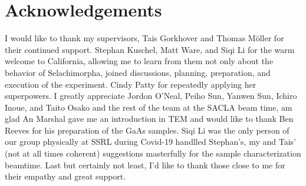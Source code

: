 \begingroup
\let\clearpage\relax
\chapter*{Acknowledgements}
\endgroup


I would like to thank my supervisors, Tais Gorkhover and Thomas Möller for their continued support. 
Stephan Kuschel, Matt Ware, and Siqi Li for the warm welcome to California, allowing me to learn from them not only about the behavior of Selachimorpha, joined discussions, planning, preparation, and execution of the experiment. Cindy Patty for repeatedly applying her superpowers. I greatly appreciate Jordon O'Neal, Peiho Sun, Yanwen Sun, Ichiro Inoue, and Taito Osako and the rest of the team at the SACLA beam time, am glad  An Marshal gave me an introduction in TEM and would like to thank  Ben Reeves for his preparation of the GaAs samples. Siqi Li was the only person of our group physically at SSRL during Covid-19  handlled Stephan's, my and Tais' (not at all times coherent) suggestions masterfully for the sample characterization beamtime.
Last but certainly not least, I'd like to thank those close to me for their empathy and great support.
